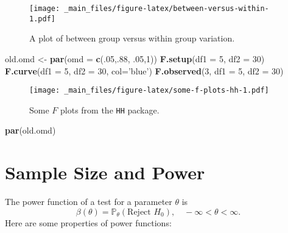 \documentclass[]{book}
\newenvironment{Shaded}{\begin{snugshade}}{\end{snugshade}}
\newcommand{\KeywordTok}[1]{\textcolor[rgb]{0.13,0.29,0.53}{\textbf{{#1}}}}
\newcommand{\DataTypeTok}[1]{\textcolor[rgb]{0.13,0.29,0.53}{{#1}}}
\newcommand{\DecValTok}[1]{\textcolor[rgb]{0.00,0.00,0.81}{{#1}}}
\newcommand{\StringTok}[1]{\textcolor[rgb]{0.31,0.60,0.02}{{#1}}}
\newcommand{\NormalTok}[1]{{#1}}
\numberwithin{equation}{chapter}
\numberwithin{figure}{chapter}
\theoremstyle{plain}
\theoremstyle{definition}
\theoremstyle{remark}
\theoremstyle{definition}
\theoremstyle{definition}
\theoremstyle{remark}
\begin{document}
\begin{figure}[htbp]
\centering
\texttt{[image: \_main\_files/figure-latex/between-versus-within-1.pdf]}
\caption{\label{fig:between-versus-within}\small A plot of between group versus
within group variation.}
\end{figure}




\begin{Shaded}
\begin{Highlighting}[]
\NormalTok{old.omd <-}\StringTok{ }\KeywordTok{par}\NormalTok{(}\DataTypeTok{omd =} \KeywordTok{c}\NormalTok{(.}\DecValTok{05}\NormalTok{,.}\DecValTok{88}\NormalTok{, .}\DecValTok{05}\NormalTok{,}\DecValTok{1}\NormalTok{))}
\KeywordTok{F.setup}\NormalTok{(}\DataTypeTok{df1 =} \DecValTok{5}\NormalTok{, }\DataTypeTok{df2 =} \DecValTok{30}\NormalTok{)}
\KeywordTok{F.curve}\NormalTok{(}\DataTypeTok{df1 =} \DecValTok{5}\NormalTok{, }\DataTypeTok{df2 =} \DecValTok{30}\NormalTok{, }\DataTypeTok{col=}\StringTok{'blue'}\NormalTok{)}
\KeywordTok{F.observed}\NormalTok{(}\DecValTok{3}\NormalTok{, }\DataTypeTok{df1 =} \DecValTok{5}\NormalTok{, }\DataTypeTok{df2 =} \DecValTok{30}\NormalTok{)}
\end{Highlighting}
\end{Shaded}

\begin{figure}[htbp]
\centering
\texttt{[image: \_main\_files/figure-latex/some-f-plots-hh-1.pdf]}
\caption{\label{fig:some-f-plots-hh}\small Some \(F\) plots from the \texttt{HH}
package.}
\end{figure}

\begin{Shaded}
\begin{Highlighting}[]
\KeywordTok{par}\NormalTok{(old.omd)}
\end{Highlighting}
\end{Shaded}




\section{Sample Size and Power}\label{sec-sample-size-and-power}

The power function of a test for a parameter \(\theta\) is \[
\beta(\theta)=\mathbb{P}_{\theta}(\mbox{Reject }H_{0}),\quad -\infty < \theta < \infty.
\] Here are some properties of power functions:
\end{document}
